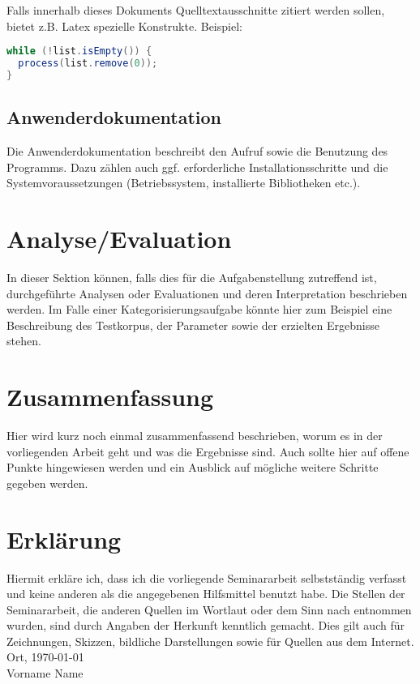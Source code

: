 \documentclass[pagesize=auto, titlepage=on]{scrartcl}
\begin{document}
Falls innerhalb dieses Dokuments Quelltextausschnitte zitiert werden sollen, bietet z.B. Latex spezielle Konstrukte. Beispiel:

\begin{lstlisting}[language=Java]
while (!list.isEmpty()) {
  process(list.remove(0));
}
\end{lstlisting}

\subsection{Anwenderdokumentation}
\label{sec:anwenderdokumentation}
Die Anwenderdokumentation beschreibt den Aufruf sowie die Benutzung des Programms.
Dazu zählen auch ggf. erforderliche Installationsschritte und die Systemvoraussetzungen (Betriebssystem, installierte Bibliotheken etc.).

\section{Analyse/Evaluation}
\label{sec:evaluation}
In dieser Sektion können, falls dies für die Aufgabenstellung zutreffend ist, durchgeführte Analysen oder Evaluationen und deren Interpretation beschrieben werden.
Im Falle einer Kategorisierungsaufgabe könnte hier zum Beispiel eine Beschreibung des Testkorpus, der Parameter sowie der erzielten Ergebnisse stehen.

\section{Zusammenfassung}
\label{sec:zusammenfassung}
Hier wird kurz noch einmal zusammenfassend beschrieben, worum es in der vorliegenden Arbeit geht und was die Ergebnisse sind.
Auch sollte hier auf offene Punkte hingewiesen werden und ein Ausblick auf mögliche weitere Schritte gegeben werden.

\printbibliography


\section*{Erklärung}

Hiermit erkläre ich, dass ich die vorliegende Seminararbeit
selbstständig verfasst und keine anderen als die angegebenen
Hilfsmittel benutzt habe. Die Stellen der Seminararbeit, die anderen
Quellen im Wortlaut oder dem Sinn nach entnommen wurden, sind durch
Angaben der Herkunft kenntlich gemacht. Dies gilt auch für
Zeichnungen, Skizzen, bildliche Darstellungen sowie für Quellen aus
dem Internet.\\[2\baselineskip]
Ort, \today \\[5\baselineskip]
Vorname Name
\end{document}
